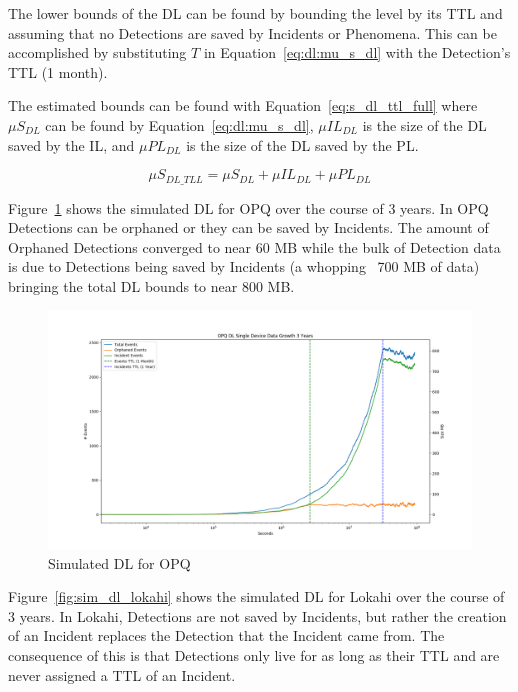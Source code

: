 The lower bounds of the DL can be found by bounding the level by its TTL and assuming that no Detections are saved by Incidents or Phenomena. This can be accomplished by substituting $T$ in Equation~\ref{eq:dl:mu_s_dl} with the Detection's TTL (1 month).

The estimated bounds can be found with Equation~\ref{eq:s_dl_ttl_full} where $\mu S_{DL}$ can be found by Equation~\ref{eq:dl:mu_s_dl}, $\mu IL_{DL}$ is the size of the DL saved by the IL, and $\mu PL_{DL}$ is the size of the DL saved by the PL\@.

\begin{equation}\label{eq:s_dl_ttl_full}
	\mu S_{DL\_TLL} = \mu S_{DL} + \mu IL_{DL} + \mu PL_{DL}
\end{equation}

Figure~\ref{fig:sim_dl_opq} shows the simulated DL for OPQ over the course of 3 years. In OPQ Detections can be orphaned or they can be saved by Incidents. The amount of Orphaned Detections converged to near 60 MB while the bulk of Detection data is due to Detections being saved by Incidents (a whopping ~700 MB of data) bringing the total DL bounds to near 800 MB\@.

\begin{figure}[H]
	\centering
	\includegraphics[width=\linewidth]{figures/sim_dl_opq.png}
	\caption{Simulated DL for OPQ}
	\label{fig:sim_dl_opq}
\end{figure}

Figure~\ref{fig:sim_dl_lokahi} shows the simulated DL for Lokahi over the course of 3 years. In Lokahi, Detections are not saved by Incidents, but rather the creation of an Incident replaces the Detection that the Incident came from. The consequence of this is that Detections only live for as long as their TTL and are never assigned a TTL of an Incident.

